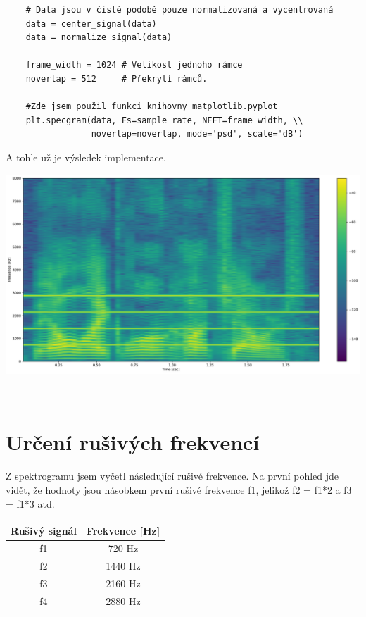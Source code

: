\documentclass[a4paper, 11pt]{article}
\begin{document}
\begin{verbatim}
    # Data jsou v čisté podobě pouze normalizovaná a vycentrovaná 
    data = center_signal(data)
    data = normalize_signal(data)
    
    frame_width = 1024 # Velikost jednoho rámce
    noverlap = 512     # Překrytí rámců. 

    #Zde jsem použil funkci knihovny matplotlib.pyplot
    plt.specgram(data, Fs=sample_rate, NFFT=frame_width, \\
                 noverlap=noverlap, mode='psd', scale='dB')

\end{verbatim}

A tohle už je výsledek implementace. \\
\begin{center}
    \includegraphics[scale=0.35]{img/3_spec.pdf} \\
\end{center}
 
\\



\section{Určení rušivých frekvencí}

Z spektrogramu jsem vyčetl následující rušivé frekvence. Na první pohled jde vidět, že hodnoty jsou násobkem první rušivé frekvence f1, jelikož   f2 = f1*2 a    f3 = f1*3    atd. 

\begin{table}[ht]
    \centering
    \begin{tabular}{| c | c |}
    \hline
        Rušivý signál & Frekvence [Hz]  \\ \hline
        f1 & 720 Hz  \\ \hline
        f2 & 1440 Hz \\ \hline
        f3 & 2160 Hz \\ \hline
        f4 & 2880 Hz \\ \hline
    \end{tabular}
\end{table}
\\
\end{document}
